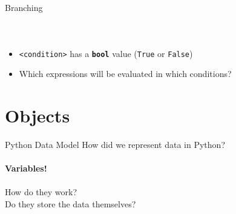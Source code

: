         \begin{frame}{Branching}
            \vspace{-3mm}
            \begin{columns}
                \inputminted[firstline=1, lastline=4, frame=single,framesep=2pt]{python3}{code-examples/branching.py}
                \inputminted[firstline=6, lastline=13, frame=single,framesep=2pt]{python3}{code-examples/branching.py}
                \inputminted[firstline=15, lastline=27, frame=single,framesep=2pt]{python3}{code-examples/branching.py}
            \end{columns}
            \begin{itemize}
                \item \texttt{<condition>} has a \textbf{\texttt{bool}} value (\texttt{True} or \texttt{False})
                \item Which expressions will be evaluated in which conditions?
            \end{itemize}
        \end{frame}

    \section{Objects}
        \begin{frame}[c]{Python Data Model}
            \pause
            \LARGE
            How did we represent data in Python?\\
            \\
            \pause
            \textbf{Variables!}\\
            \pause
            \\
            How do they work?\\
            \pause
             Do they store the data themselves?
            \pause
        \end{frame}

